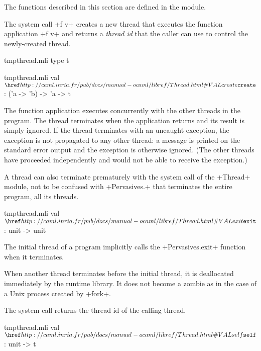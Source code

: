The functions described in this section are defined in the
 module.\medskip

The system call  \ml+f v+ creates a new thread that
executes the function application \ml+f v+ and returns a \emph{thread id} that
the caller can use to control the newly-created thread.
%
\begin{codefile}{tmpthread.mli}
type t
\end{codefile}
%
\begin{listingcodefile}{tmpthread.mli}
val $\libvalue{Thread}{create}$ : ('a -> 'b) -> 'a -> t
\end{listingcodefile}
% 
The function application executes concurrently with the other threads
in the program. The thread terminates when the application returns and
its result is simply ignored.  If the thread terminates with an
uncaught exception, the exception is not propagated to any other
thread: a message is printed on the standard error output and the
exception is otherwise ignored.  (The other threads have proceeded
independently and would not be able to receive the exception.)

A thread can also terminate prematurely with the system call
 of the \ml+Thread+ module, not to be confused with
\ml+Pervasives.+ that terminates the
entire program, {\ie} all its threads.
%
\begin{listingcodefile}{tmpthread.mli}
val $\indexlibvalue{Thread}{exit}$ : unit -> unit
\end{listingcodefile}
%
The initial thread of a program implicitly calls the
\ml+Pervasives.exit+ function when it terminates.

When another thread terminates before the initial thread, it is
deallocated immediately by the {\ocaml} runtime library.  It does not
become a zombie as in the case of a Unix process created by \ml+fork+.

The system call  returns the thread id of the
calling thread.
\begin{listingcodefile}{tmpthread.mli}
val $\libvalue{Thread}{self}$ : unit -> t
\end{listingcodefile}

